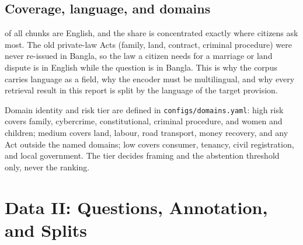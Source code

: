 \documentclass[10pt,a4paper]{article}
\begin{document}
\begin{sample}

\end{sample}

\begin{sample}

\end{sample}

\subsection{Coverage, language, and domains}
\begin{table}[H]
\centering

\caption{Chunks per domain, by language of the statutory text, with the domain's risk tier. The ``other'' row holds every Act outside the named domains.}
\label{tab:corpus_domain}
\end{table}


\begin{finding}
\pctEnChunks{} of all chunks are English, and the share is concentrated exactly where citizens ask most. The old private-law Acts (family, land, contract, criminal procedure) were never re-issued in Bangla, so the law a citizen needs for a marriage or land dispute is in English while the question is in Bangla. This is why the corpus carries language as a field, why the encoder must be multilingual, and why every retrieval result in this report is split by the language of the target provision.
\end{finding}

Domain identity and risk tier are defined in \texttt{configs/domains.yaml}: high risk covers family, cybercrime, constitutional, criminal procedure, and women and children; medium covers land, labour, road transport, money recovery, and any Act outside the named domains; low covers consumer, tenancy, civil registration, and local government. The tier decides framing and the abstention threshold only, never the ranking.

\section{Data II: Questions, Annotation, and Splits}
\end{document}
